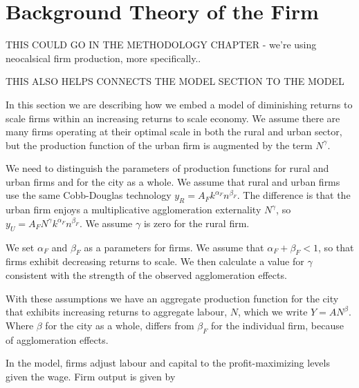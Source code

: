 \chapter{Background Theory of the Firm} \label{appendix-firm-theory}

{\color{red}
THIS COULD GO IN THE METHODOLOGY CHAPTER - we're using neocalsical firm production, more specifically..

THIS ALSO HELPS CONNECTS THE MODEL SECTION TO THE MODEL

}

In this section we are describing how we embed a model of diminishing returns to scale firms within an increasing returns to scale economy. 
We assume there are many firms operating at their optimal scale in both the rural and urban sector, but the production function of the urban firm is augmented by the term $N^\gamma$. 


We need to distinguish the parameters of production functions for rural and urban firms and for the city as a whole. We assume that rural and  urban firms use the same Cobb-Douglas technology ${y_R}=A_Fk^{\alpha_F}n^{\beta_F}$. The difference is that the urban firm enjoys a multiplicative agglomeration externality $N^\gamma$, so ${y_U}=A_FN^\gamma  k^{\alpha_F}n^{\beta_F}$. We assume $\gamma$ is zero for the rural firm. 

We set $\alpha_F$ and $\beta_F$ as a parameters for firms. We assume that $\alpha_F+\beta_F<1$, so that firms exhibit decreasing returns to scale.  We then calculate a value for $\gamma$ consistent with the strength of the observed agglomeration effects. 


With these assumptions we have an aggregate production function for the city that exhibits increasing returns to aggregate labour, $N$,  which we write $Y=AN^\beta$. Where $\beta$ for the city as a whole, differs from $\beta_F$ for the individual firm, because of agglomeration effects. 



In the model, firms adjust labour and capital to the profit-maximizing levels given the wage. %
Firm output is given by

